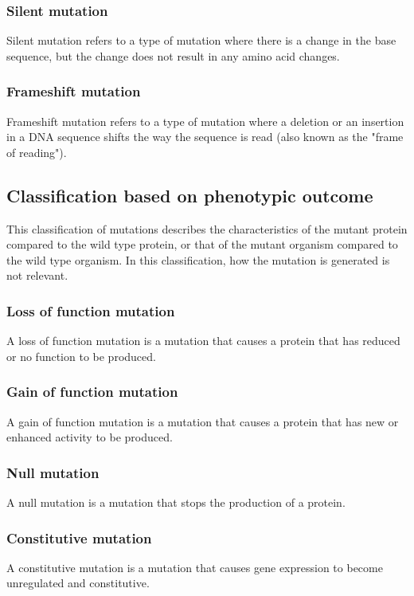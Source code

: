 \documentclass[11pt]{article}
\begin{document}
\subsubsection{Silent mutation}
\label{sec:orgf78e6d7}
Silent mutation refers to a type of mutation where there is a change in the base sequence, but the change does not result in any amino acid changes.

\subsubsection{Frameshift mutation}
\label{sec:orgba8fbb1}
Frameshift mutation refers to a type of mutation where a deletion or an insertion in a DNA sequence shifts the way the sequence is read (also known as the "frame of reading").

\newpage

\subsection{Classification based on phenotypic outcome}
\label{sec:orgc2be617}
This classification of mutations describes the characteristics of the mutant protein compared to the wild type protein, or that of the mutant organism compared to the wild type organism. In this classification, how the mutation is generated is not relevant.

\subsubsection{Loss of function mutation}
\label{sec:org3b5a98d}
A loss of function mutation is a mutation that causes a protein that has reduced or no function to be produced.

\subsubsection{Gain of function mutation}
\label{sec:org9fe449b}
A gain of function mutation is a mutation that causes a protein that has new or enhanced activity to be produced.

\subsubsection{Null mutation}
\label{sec:orgb167acc}
A null mutation is a mutation that stops the production of a protein.

\subsubsection{Constitutive mutation}
\label{sec:orgd4dc00f}
A constitutive mutation is a mutation that causes gene expression to become unregulated and constitutive.
\end{document}
